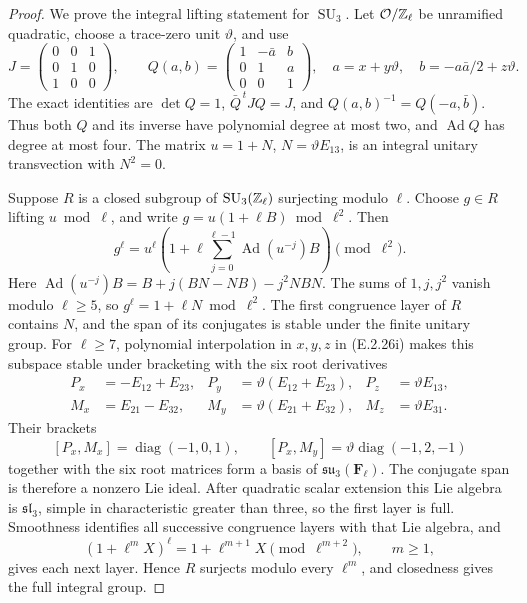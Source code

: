 \begin{proof}
We prove the integral lifting statement for \(\operatorname{SU}_3\).
Let \(\mathcal O/\mathbb Z_\ell\) be unramified quadratic, choose
a trace-zero unit \(\vartheta\), and use
\[
 J=\begin{pmatrix}0&0&1\\0&1&0\\1&0&0\end{pmatrix},\qquad
 Q(a,b)=\begin{pmatrix}1&-\bar a&b\\0&1&a\\0&0&1\end{pmatrix},
 \quad a=x+y\vartheta,\quad
 b=-a\bar a/2+z\vartheta.
 \tag{E.2.26i}
\]
The exact identities are
\(\det Q=1\), \(\bar Q^{\,t}JQ=J\), and
\(Q(a,b)^{-1}=Q(-a,\bar b)\). Thus both \(Q\) and
its inverse have polynomial degree at most two, and
\(\operatorname{Ad}Q\) has degree at most four.
The matrix \(u=1+N\), \(N=\vartheta E_{13}\), is an
integral unitary transvection with \(N^2=0\).

Suppose \(R\) is a closed subgroup of
\(\operatorname{SU}_3(\mathbb Z_\ell)\) surjecting modulo \(\ell\).
Choose \(g\in R\) lifting \(u\bmod\ell\), and write
\(g=u(1+\ell B)\bmod\ell^2\). Then
\[
 g^\ell=u^\ell\left(1+\ell
       \sum_{j=0}^{\ell-1}\operatorname{Ad}(u^{-j})B\right)
       \pmod{\ell^2}.
\]
Here
\(\operatorname{Ad}(u^{-j})B
 =B+j(BN-NB)-j^2NBN\).
The sums of \(1,j,j^2\) vanish modulo \(\ell\geq5\),
so \(g^\ell=1+\ell N\bmod\ell^2\).
The first congruence layer of \(R\) contains \(N\), and
the span of its conjugates is stable under the finite unitary
group. For \(\ell\geq7\), polynomial interpolation in
\(x,y,z\) in (E.2.26i) makes this subspace stable under
bracketing with the six root derivatives
\[
\begin{aligned}
 P_x&=-E_{12}+E_{23},&
 P_y&=\vartheta(E_{12}+E_{23}),&P_z&=\vartheta E_{13},\\
 M_x&=E_{21}-E_{32},&
 M_y&=\vartheta(E_{21}+E_{32}),&M_z&=\vartheta E_{31}.
\end{aligned}
\]
Their brackets
\[
 [P_x,M_x]=\operatorname{diag}(-1,0,1),\qquad
 [P_x,M_y]=\vartheta\operatorname{diag}(-1,2,-1)
\]
together with the six root matrices form a basis of
\(\mathfrak{su}_3(\mathbf F_\ell)\).
The conjugate span is therefore a nonzero Lie ideal.
After quadratic scalar extension this Lie algebra is
\(\mathfrak{sl}_3\), simple in characteristic greater
than three, so the first layer is full. Smoothness identifies
all successive congruence layers with that Lie algebra, and
\[
 (1+\ell^mX)^\ell
      =1+\ell^{m+1}X\pmod{\ell^{m+2}},\qquad m\geq1,
 \tag{E.2.26j}
\]
gives each next layer. Hence \(R\) surjects modulo every
\(\ell^m\), and closedness gives the full integral group.


\end{proof}
